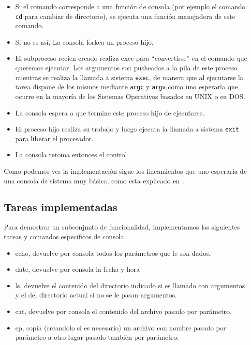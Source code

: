 \begin{itemize}
	\item Si el comando corresponde a una funci\'on de consola (por ejemplo el comando \texttt{cd}
	para cambiar de directorio), se ejecuta una funci\'on manejadora de este comando.
	\item Si no es as\'i, La consola forkea un proceso hijo.
	\item El subproceso recien creado realiza exec para	``convertirse'' en el comando que queremos ejecutar. 
	Los argumentos son pusheados a la pila de este proceso mientras se realiza la llamada a sistema \texttt{exec}, 
	de manera que al ejecutarse la tarea dispone de los mismos mediante \texttt{argc} y \texttt{argv} como uno 
	esperar\'ia que ocurre en la mayor\'ia de los Sistemas Operativos basados en UNIX o en DOS.
	\item La consola espera a que termine este proceso hijo de ejecutarse.
	\item El proceso hijo realiza su trabajo y luego ejecuta la llamada a sistema \texttt{exit} para liberar
	el procesador.
	\item La consola retoma entonces el control.
\end{itemize}

Como podemos ver la implementaci\'on sigue los lineamientos que uno esperar\'ia de una consola de sistema muy b\'asica,
como esta explicado en~\cite{systemv}.

\subsection{Tareas implementadas}

Para demostrar un subconjunto de funcionalidad, implementamos las siguientes tareas y comandos espec\'ificos de consola

\begin{itemize}
	\item echo, devuelve por consola todos los par\'ametros que le son dados.
	\item date, devuelve por consola la fecha y hora
	\item ls, devuelve el contenido del directorio indicado si es llamado con argumentos y
	el del directorio actual si no se le pasan argumentos.
	\item cat, devuelve por consola el contenido del archivo pasado por par\'ametro.
	\item cp, copia (creandolo si es necesario) un archivo con nombre pasado por par\'ametro a otro lugar 
	pasado tambi\'en por par\'ametro.
\end{itemize}
